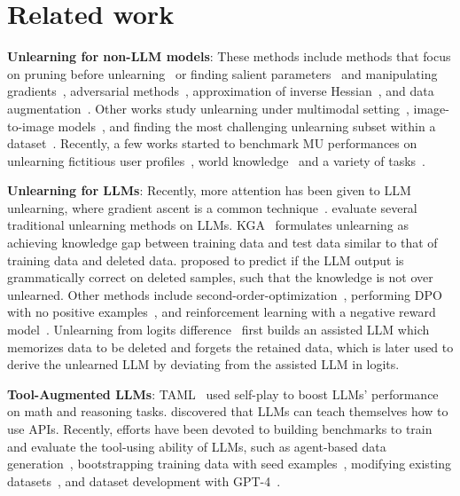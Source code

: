 \section{Related work}
\textbf{Unlearning for non-LLM models}: These methods include 
methods that focus on pruning before unlearning~\citep{jia2023model} or  
finding salient parameters~\citep{fan2024salun} and manipulating gradients~\cite{pmlr-v134-ullah21a,Hoang_2024_WACV}, 
adversarial methods~\citep{Liu_2023_ICCV,setlur2022adversarial,wei2023shared}, approximation of inverse Hessian~\citep{zhang2024towards}, and data augmentation~\citep{Choi_2024_CVPR}. Other works study unlearning under multimodal setting~\citep{cheng2023multimodal}, image-to-image models~\citep{li2024machine}, and finding the most challenging unlearning subset within a dataset~\citep{fan2024challenging}. Recently, a few works started to benchmark MU performances on unlearning fictitious user profiles~\citep{maini2024tofu}, world knowledge~\citep{jin2024rwku} and a variety of tasks~\citep{cheng2024mubench}.


\textbf{Unlearning for LLMs}: Recently, more attention has been given to LLM unlearning, where gradient ascent is a common technique~\citep{eldan2023whos,jang-etal-2023-knowledge}. \citep{yao-etal-2024-machine} evaluate several traditional unlearning methods on LLMs. KGA~\citep{wang-etal-2023-kga} formulates unlearning as achieving knowledge gap between training data and test data similar to that of training data and deleted data. \citet{yao2023large} proposed to predict if the LLM output is grammatically correct on deleted samples, such that the knowledge is not over unlearned. Other methods include second-order-optimization~\citep{jia-etal-2024-soul}, performing DPO with no positive examples~\citep{zhang2024negative}, and reinforcement learning with a negative reward model~\citep{kassem-etal-2023-preserving}. Unlearning from logits difference~\citep{ji2024reversing} first builds an assisted LLM which memorizes data to be deleted and forgets the retained data, which is later used to derive the unlearned LLM by deviating from the assisted LLM in logits. 


\textbf{Tool-Augmented LLMs}: TAML~\citep{parisi2022talm} used self-play to boost LLMs' performance on math and reasoning tasks. \citet{schick2023toolformer} discovered that LLMs can teach themselves how to use APIs. Recently, efforts have been devoted to building benchmarks to train and evaluate the tool-using ability of LLMs, such as agent-based data generation~\citep{tang2023toolalpaca,li-etal-2023-api}, bootstrapping training data with seed examples~\citep{patil2023gorilla}, modifying existing datasets~\citep{basu-etal-2024-api}, and dataset development with GPT-4~\citep{qin2024toolllm}.